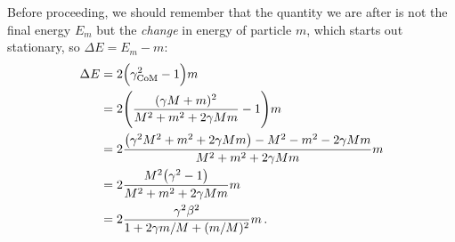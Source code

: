 \documentclass[main.tex]{subfiles}
\begin{document}
\begin{extracontent}
Before proceeding, we should remember that the quantity we are after is not the final energy \(E_m\) but the \emph{change} in energy of particle \(m\), which starts out stationary, so \(\Delta E = E_m - m\):
%
\begin{align}
\Delta E &=  2 \qty(\gamma^2 _{\text{CoM}} - 1) m\\
&= 2\qty( \frac{(\gamma M + m)^2}{M^2 + m^2 + 2 \gamma Mm}
- 1) m \\
&= 2 \frac{\qty(\gamma^2 M^2 + m^2 + 2 \gamma Mm) - M^2 - m^2 - 2 \gamma M m}{M^2 + m^2 + 2 \gamma Mm} m  \\
&= 2 \frac{M^2 \qty(\gamma^2 - 1)}{M^2 + m^2 + 2 \gamma Mm} m  \\
&= 2 \frac{\gamma^2 \beta^2}{1 + 2 \gamma m/M + (m/M)^2} m
\,.
\end{align}
\end{extracontent}
\end{document}
